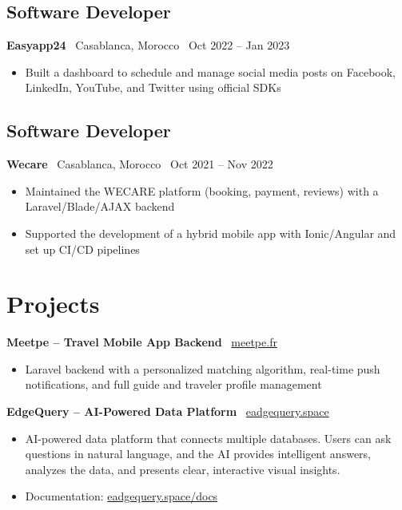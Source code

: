 \documentclass[10pt,a4paper]{article}
\begin{document}
\subsection*{Software Developer}
{\small \textbf{Easyapp24} \textbar\ Casablanca, Morocco \textbar\ Oct 2022 -- Jan 2023}
\vspace{2pt}
\begin{itemize}
  \item {\small Built a dashboard to schedule and manage social media posts on Facebook, LinkedIn, YouTube, and Twitter using official SDKs}
\end{itemize}
\vspace{2pt}

\subsection*{Software Developer}
{\small \textbf{Wecare} \textbar\ Casablanca, Morocco \textbar\ Oct 2021 -- Nov 2022}
\vspace{2pt}
\begin{itemize}
  \item {\small Maintained the WECARE platform (booking, payment, reviews) with a Laravel/Blade/AJAX backend}
  \item {\small Supported the development of a hybrid mobile app with Ionic/Angular and set up CI/CD pipelines}
\end{itemize}

\section*{Projects}

{\small \textbf{Meetpe -- Travel Mobile App Backend} \textbar\ \href{https://www.meetpe.fr/}{meetpe.fr}}
\vspace{2pt}
\begin{itemize}
  \item {\small Laravel backend with a personalized matching algorithm, real-time push notifications, and full guide and traveler profile management}
\end{itemize}

\vspace{4pt}

{\small \textbf{EdgeQuery -- AI-Powered Data Platform} \textbar\ \href{https://eadgequery.space}{eadgequery.space}}
\vspace{2pt}
\begin{itemize}
  \item {\small AI-powered data platform that connects multiple databases. Users can ask questions in natural language, and the AI provides intelligent answers, analyzes the data, and presents clear, interactive visual insights.}
  \item {\small Documentation: \href{https://eadgequery.space/docs}{eadgequery.space/docs}}
\end{itemize}
\end{document}
